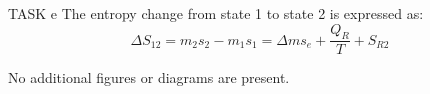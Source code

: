 TASK e  
The entropy change from state 1 to state 2 is expressed as:  
\[
\Delta S_{12} = m_2 s_2 - m_1 s_1 = \Delta m s_e + \frac{Q_R}{T} + S_{R2}
\]  

No additional figures or diagrams are present.